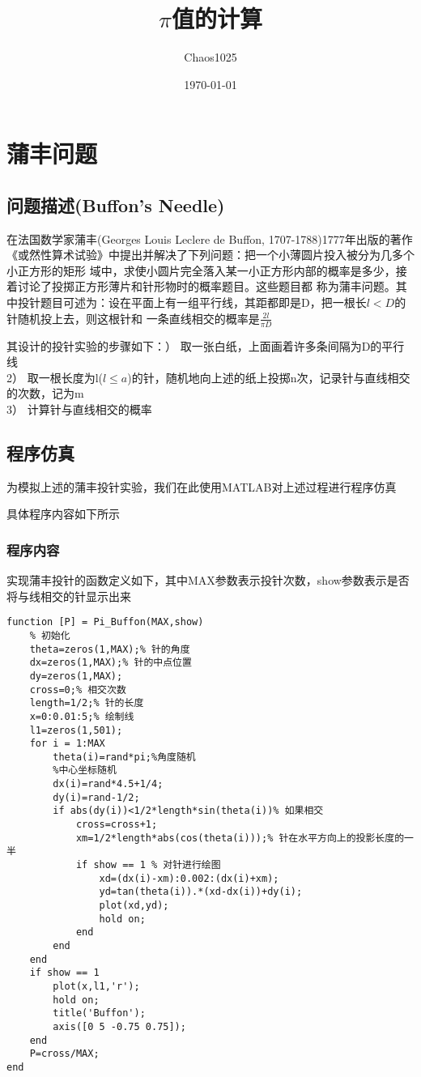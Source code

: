 \documentclass[UTF8]{ctexart}
\title{\Huge \textbf{$\pi$值的计算}}
\author{Chaos1025}
\date{\today}
\begin{document}
    \maketitle
    \tableofcontents
    \section{蒲丰问题}

    \subsection{问题描述(Buffon's Needle)}
        在法国数学家蒲丰(Georges Louis Leclere de Buffon, 1707-1788)1777年出版的著作《或然性算术试验》中提出并解决了下列问题：把一个小薄圆片投入被分为几多个小正方形的矩形
        域中，求使小圆片完全落入某一小正方形内部的概率是多少，接着讨论了投掷正方形薄片和针形物时的概率题目。这些题目都
        称为蒲丰问题。其中投针题目可述为：设在平面上有一组平行线，其距都即是D，把一根长$l<D$的针随机投上去，则这根针和
        一条直线相交的概率是$\frac{2l}{\pi D}$
       

        其设计的投针实验的步骤如下：） 取一张白纸，上面画着许多条间隔为D的平行线\\
        2） 取一根长度为l($l\leq a$)的针，随机地向上述的纸上投掷n次，记录针与直线相交的次数，记为m\\
        3） 计算针与直线相交的概率\\
             
        
    \subsection{程序仿真}
        为模拟上述的蒲丰投针实验，我们在此使用MATLAB对上述过程进行程序仿真\par
        具体程序内容如下所示
    \subsubsection{程序内容}
        实现蒲丰投针的函数定义如下，其中MAX参数表示投针次数，show参数表示是否将与线相交的针显示出来
    \begin{lstlisting}[title=Function for Buffon's Needle, frame=shadowbox]
function [P] = Pi_Buffon(MAX,show)
    % 初始化
    theta=zeros(1,MAX);% 针的角度
    dx=zeros(1,MAX);% 针的中点位置
    dy=zeros(1,MAX);
    cross=0;% 相交次数
    length=1/2;% 针的长度
    x=0:0.01:5;% 绘制线
    l1=zeros(1,501);
    for i = 1:MAX
        theta(i)=rand*pi;%角度随机
        %中心坐标随机
        dx(i)=rand*4.5+1/4;
        dy(i)=rand-1/2;
        if abs(dy(i))<1/2*length*sin(theta(i))% 如果相交
            cross=cross+1;
            xm=1/2*length*abs(cos(theta(i)));% 针在水平方向上的投影长度的一半
            if show == 1 % 对针进行绘图
                xd=(dx(i)-xm):0.002:(dx(i)+xm);
                yd=tan(theta(i)).*(xd-dx(i))+dy(i);
                plot(xd,yd);
                hold on;
            end
        end
    end
    if show == 1
        plot(x,l1,'r');
        hold on;
        title('Buffon');
        axis([0 5 -0.75 0.75]);
    end
    P=cross/MAX;
end
    \end{lstlisting}
\end{document}
